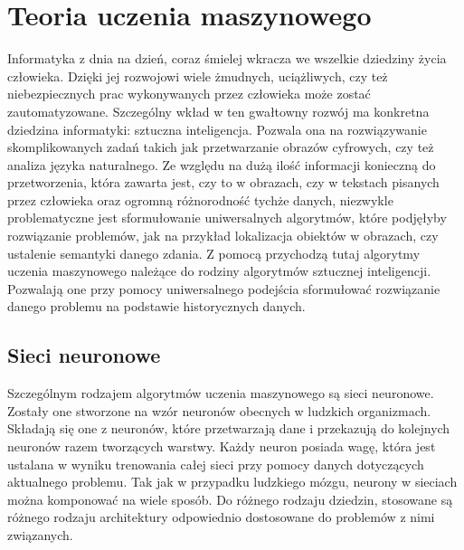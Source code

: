 \newpage
\section{Teoria uczenia maszynowego}
Informatyka z dnia na dzień, coraz śmielej wkracza we wszelkie dziedziny życia człowieka. Dzięki jej rozwojowi wiele żmudnych, uciążliwych, czy też niebezpiecznych prac wykonywanych przez człowieka może zostać zautomatyzowane. Szczególny wkład w ten gwałtowny rozwój ma konkretna dziedzina informatyki: sztuczna inteligencja. Pozwala ona na rozwiązywanie skomplikowanych zadań takich jak przetwarzanie obrazów cyfrowych, czy też analiza języka naturalnego. Ze względu na dużą ilość informacji konieczną do przetworzenia, która zawarta jest, czy to w obrazach, czy w tekstach pisanych przez człowieka oraz ogromną różnorodność tychże danych, niezwykle problematyczne jest sformułowanie uniwersalnych algorytmów, które podjęłyby rozwiązanie problemów, jak na przykład lokalizacja obiektów w obrazach, czy ustalenie semantyki danego zdania. Z pomocą przychodzą tutaj algorytmy uczenia maszynowego należące do rodziny algorytmów sztucznej inteligencji. Pozwalają one przy pomocy uniwersalnego podejścia sformułować rozwiązanie danego problemu na podstawie historycznych danych.
\subsection{Sieci neuronowe}
Szczególnym rodzajem algorytmów uczenia maszynowego są sieci neuronowe. Zostały one stworzone na wzór neuronów obecnych w ludzkich organizmach. Składają się one z neuronów, które przetwarzają dane i przekazują do kolejnych neuronów razem tworzących warstwy. Każdy neuron posiada wagę, która jest ustalana w wyniku trenowania całej sieci przy pomocy danych dotyczących aktualnego problemu. Tak jak w przypadku ludzkiego mózgu, neurony w sieciach można komponować na wiele sposób. Do różnego rodzaju dziedzin, stosowane są różnego rodzaju architektury odpowiednio dostosowane do problemów z nimi związanych.
